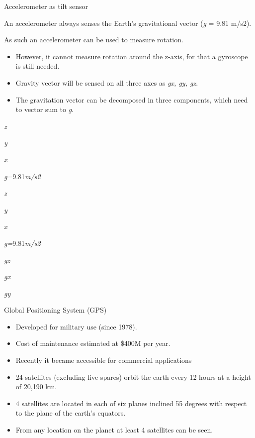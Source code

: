 \documentclass[compress]{beamer}
\begin{document}
\begin{frame}{Accelerometer as tilt sensor}

An accelerometer always senses the Earth's gravitational vector
(\emph{g} = 9.81 m/s2).

As such an accelerometer can be used to measure rotation.

\begin{itemize}

\item
  However, it cannot measure rotation around the z-axis, for that a
  gyroscope is still needed.
\item
  Gravity vector will be sensed on all three axes as \emph{gx, gy, gz}.
\item
  The gravitation vector can be decomposed in three components, which
  need to vector sum to \emph{g}.
\end{itemize}

\emph{z}

\emph{y}

\emph{x}

\emph{g=}9.81\emph{m/s2}

\emph{z}

\emph{y}

\emph{x}

\emph{g=}9.81\emph{m/s2}

\emph{gz}

\emph{gx}

\emph{gy}

\end{frame}

\begin{frame}{Global Positioning System (GPS)}

\begin{itemize}

\item
  Developed for military use (since 1978).
\item
  Cost of maintenance estimated at \$400M per year.
\item
  Recently it became accessible for commercial applications
\item
  24 satellites (excluding five spares) orbit the earth every 12 hours
  at a height of 20,190 km.
\item
  4 satellites are located in each of six planes inclined 55 degrees
  with respect to the plane of the earth's equators.
\item
  From any location on the planet at least 4 satellites can be seen.
\end{itemize}

\end{frame}
\end{document}
